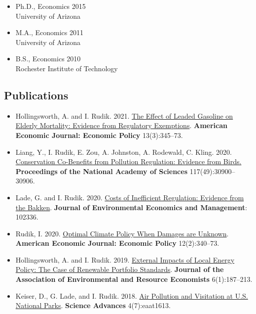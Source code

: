 \documentclass[12pt]{res} %
\begin{document}
\begin{resume}

	\begin{itemize}
		\item[] Ph.D., Economics \hfill 2015\\
		University of Arizona

		\item[] M.A., Economics \hfill 2011\\
		University of Arizona

		\item[] B.S.,  Economics \hfill 2010\\
		Rochester Institute of Technology

	\end{itemize}
\vspace{-.2in}
\subsection{Publications}
\begin{itemize}
	\item[] Hollingsworth, A. and I. Rudik. 2021. \href{https://osf.io/preprints/socarxiv/rdy6g}{The Effect of Leaded Gasoline on Elderly Mortality: Evidence from Regulatory Exemptions}. \textbf{American Economic Journal: Economic Policy} 13(3):345--73.
	\item[] Liang, Y., I. Rudik, E. Zou, A. Johnston, A. Rodewald, C. Kling. 2020. \href{https://www.pnas.org/content/early/2020/11/23/2013568117}{Conservation Co-Benefits from Pollution Regulation: Evidence from Birds.} \textbf{Proceedings of the National Academy of Sciences} 117(49):30900--30906.
	\item[] Lade, G. and I. Rudik. 2020. \href{https://papers.ssrn.com/sol3/papers.cfm?abstract_id=3086728}{Costs of Inefficient Regulation: Evidence from the Bakken}. \textbf{Journal of Environmental Economics and Management}: 102336.
	\item[] Rudik, I. 2020. \href{https://www.aeaweb.org/articles?id=10.1257/pol.20160541}{Optimal Climate Policy When Damages are Unknown}. \textbf{American Economic Journal: Economic Policy} 12(2):340--73.
	\item[] Hollingsworth, A. and I. Rudik. 2019. \href{http://papers.ssrn.com/sol3/papers.cfm?abstract_id=2697222}{External Impacts of Local Energy Policy: The Case of Renewable Portfolio Standards}. \textbf{Journal of the Association of Environmental and Resource Economists} 6(1):187--213.
	\item[] Keiser, D., G. Lade, and I. Rudik. 2018. \href{http://advances.sciencemag.org/content/4/7/eaat1613}{Air Pollution and Visitation at U.S. National Parks}. \textbf{Science Advances} 4(7):eaat1613.

\end{itemize}
\end{resume}
\end{document}
